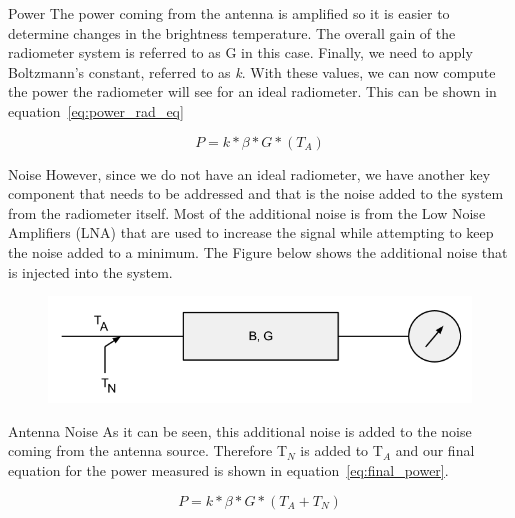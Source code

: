 \documentclass{beamer}
\begin{document}
\begin{frame}
\begin{block}{Power}
The power coming from the antenna is amplified so it is easier to determine changes in the brightness temperature.  The overall gain of the radiometer system is referred to as G in this case.  Finally, we need to apply Boltzmann's constant, referred to as \textit{k}.  With these values, we can now compute the power the radiometer will see for an ideal radiometer.  This can be shown in equation~\ref{eq:power_rad_eq}

\begin{equation} \label{eq:power_rad_eq}
P=k*\beta*G*(T_{A})
\end{equation}
\end{block}

\end{frame}

\begin{frame}
\begin{block}{Noise}
However, since we do not have an ideal radiometer, we have another key component that needs to be addressed and that is the noise added to the system from the radiometer itself.  Most of the additional noise is from the Low Noise Amplifiers (LNA) that are used to increase the signal while attempting to keep the noise added to a minimum.  The Figure below shows the additional noise that is injected into the system.

{\begin{figure}[h!tb] 
\centering
\includegraphics[width=\textwidth]{../Images/radiometer_noise_added.png}
\label{noiserad}
\end{figure}
}
\end{block}
\end{frame}

\begin{frame}
\begin{block}{Antenna Noise}
As it can be seen, this additional noise is added to the noise coming from the antenna source.  Therefore T$_{N}$ is added to T$_{A}$ and our final equation for the power measured is shown in equation~\ref{eq:final_power}.  

\begin{equation} \label{eq:final_power}
P=k*\beta*G*(T_{A}+T_{N})
\end{equation}
\end{block}
\end{frame}
\end{document}
